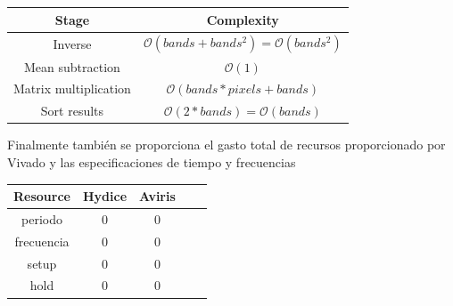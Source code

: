 \begin{center}
 \begin{tabular}{|c|c|} 
 \hline
 Stage & Complexity \\ [0.5ex] 
 \hline\hline
 Inverse & $\mathcal{O}(bands+bands^2) = \mathcal{O}(bands^2)$\\ 
 \hline
 Mean subtraction & $\mathcal{O}(1)$\\
 \hline
 Matrix multiplication & $\mathcal{O}(bands*pixels+bands)$\\
 \hline
 Sort results & $\mathcal{O}(2*bands) = \mathcal{O}(bands)$\\
 \hline
\end{tabular}
\end{center}

Finalmente también se proporciona el gasto total de recursos proporcionado por Vivado y las especificaciones de tiempo y frecuencias

\begin{center}
 \begin{tabular}{|c|c|c|c|c|} 
 \hline
 Resource & Hydice & Aviris\\ [0.5ex] 
 \hline\hline
 periodo & 0 & 0\\ 
 \hline
 frecuencia & 0 & 0\\ 
 \hline
 setup & 0 & 0\\ 
 \hline
 hold & 0 & 0\\ 
 \hline
\end{tabular}
\end{center}